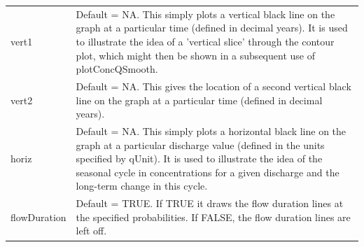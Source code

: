 \documentclass[a4paper,11pt]{article}\usepackage{graphicx, color}
\begin{document}
\begin{table}[ht]
\begin{tabularx}{\textwidth}{lX}
vert1 & Default = NA.  This simply plots a vertical black line on the graph at a particular time (defined in decimal years).  It is used to illustrate the idea of a 'vertical slice' through the contour plot, which might then be shown in a subsequent use of plotConcQSmooth.  \\
vert2 & Default = NA.  This gives the location of a second vertical black line on the graph at a particular time (defined in decimal years). \\
horiz & Default = NA.  This simply plots a horizontal black line on the graph at a particular discharge value (defined in the units specified by qUnit).  It is used to illustrate the idea of the seasonal cycle in concentrations for a given discharge and the long-term change in this cycle.  \\
flowDuration & Default = TRUE.  If TRUE it draws the flow duration lines at the specified probabilities.  If FALSE, the flow duration lines are left off.\\
\hline
\end{tabularx}

\end{table}
\end{document}
